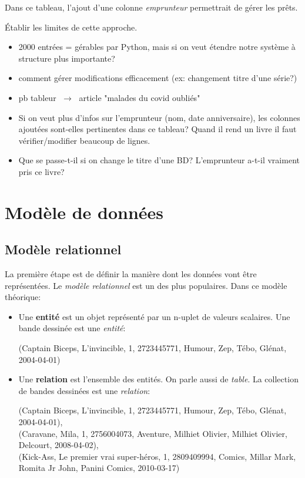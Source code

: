 \documentclass[a4paper,11pt]{article}
\begin{document}
\begin{Form}
Dans ce tableau, l'ajout d'une colonne \emph{emprunteur} permettrait de gérer les prêts.
\begin{activite}
Établir les limites de cette approche.
\end{activite}
\begin{commentprof}
\begin{itemize}
\item 2000 entrées = gérables par Python, mais si on veut étendre notre système à structure plus importante?
\item comment gérer modifications efficacement (ex: changement titre d'une série?)
\item pb tableur $\;\rightarrow\;$ article "malades du covid oubliés"
\item Si on veut plus d'infos sur l'emprunteur (nom, date anniversaire), les colonnes ajoutées sont-elles pertinentes dans ce tableau? Quand il rend un livre il faut vérifier/modifier beaucoup de lignes.
\item Que se passe-t-il si on change le titre d'une BD? L'emprunteur a-t-il vraiment pris ce livre?
\end{itemize}
\end{commentprof}
\section{Modèle de données}
\subsection{Modèle relationnel}
La première étape est de définir la manière dont les données vont être représentées. Le \emph{modèle relationnel} est un des plus populaires. Dans ce modèle théorique:
\begin{itemize}
\item Une \textbf{entité} est un objet représenté par un n-uplet de valeurs scalaires. Une bande dessinée est une \emph{entité}:
\begin{center}
(Captain Biceps, L'invincible, 1, 2723445771, Humour, Zep, Tébo, Glénat, 2004-04-01)
\end{center}
\item Une \textbf{relation} est l'ensemble des entités. On parle aussi de \emph{table}. La collection  de bandes dessinées est une \emph{relation}:
\begin{center}
(Captain Biceps, L'invincible, 1, 2723445771, Humour, Zep, Tébo, Glénat, 2004-04-01),\\
\small{(Caravane, Mila, 1, 2756004073, Aventure, Milhiet Olivier, Milhiet Olivier, Delcourt, 2008-04-02)},\\
(Kick-Ass, Le premier vrai super-héros, 1, 2809409994, Comics, Millar Mark, Romita Jr John, Panini Comics, 2010-03-17)


\end{center}
\end{itemize}
\end{Form}
\end{document}
